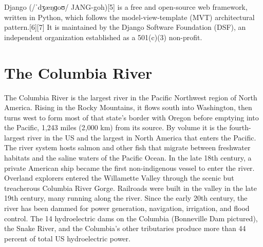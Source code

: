 \documentclass{article}
\begin{document}
{\setlength{\parindent}{1cm}}Django (/ˈdʒæŋɡoʊ/ JANG-goh)[5] is a free and open-source web framework, written in Python, which follows the model-view-template (MVT) architectural pattern.[6][7] It is maintained by the Django Software Foundation (DSF), an independent organization established as a 501(c)(3) non-profit.

\section[Columbia River]{The Columbia River}{\setlength{\parindent}{1cm}}

{\setlength{\parindent}{1cm}}The Columbia River is the largest river in the Pacific Northwest region of North America. Rising in the Rocky Mountains, it flows south into Washington, then turns west to form most of that state's border with Oregon before emptying into the Pacific, 1,243 miles (2,000 km) from its source. By volume it is the fourth-largest river in the US and the largest in North America that enters the Pacific. The river system hosts salmon and other fish that migrate between freshwater habitats and the saline waters of the Pacific Ocean. In the late 18th century, a private American ship became the first non-indigenous vessel to enter the river. Overland explorers entered the Willamette Valley through the scenic but treacherous Columbia River Gorge. Railroads were built in the valley in the late 19th century, many running along the river. Since the early 20th century, the river has been dammed for power generation, navigation, irrigation, and flood control. The 14 hydroelectric dams on the Columbia (Bonneville Dam pictured), the Snake River, and the Columbia's other tributaries produce more than 44 percent of total US hydroelectric power.
\end{document}
